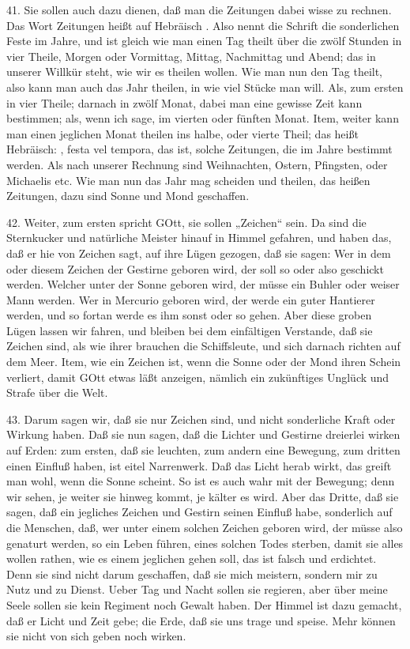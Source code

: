 41. Sie sollen auch dazu dienen, daß man die Zeitungen dabei wisse zu rechnen. Das Wort Zeitungen heißt auf Hebräisch . Also nennt die Schrift die sonderlichen Feste im Jahre, und ist gleich wie man einen Tag theilt über die zwölf Stunden in vier Theile, Morgen oder Vormittag, Mittag, Nachmittag und Abend; das in unserer Willkür steht, wie wir es theilen wollen. Wie man nun den Tag theilt, also kann man auch das Jahr theilen, in wie viel Stücke man will. Als, zum ersten in vier Theile; darnach in zwölf Monat, dabei man eine gewisse Zeit kann bestimmen; als, wenn ich sage, im vierten oder fünften Monat. Item, weiter kann man einen jeglichen Monat theilen ins halbe, oder vierte Theil; das heißt Hebräisch: , festa vel tempora, das ist, solche Zeitungen, die im Jahre bestimmt werden. Als nach unserer Rechnung sind Weihnachten, Ostern, Pfingsten, oder Michaelis etc. Wie man nun das Jahr mag scheiden und theilen, das heißen Zeitungen, dazu sind Sonne und Mond geschaffen.

42. Weiter, zum ersten spricht GOtt, sie sollen „Zeichen“ sein. Da sind die Sternkucker und natürliche Meister hinauf in Himmel gefahren, und haben das, daß er hie von Zeichen sagt, auf ihre Lügen gezogen, daß sie sagen: Wer in dem oder diesem Zeichen der Gestirne geboren wird, der soll so oder also geschickt werden. Welcher unter der Sonne geboren wird, der müsse ein Buhler oder weiser Mann werden. Wer in Mercurio geboren wird, der werde ein guter Hantierer werden, und so fortan werde es ihm sonst oder so gehen. Aber diese groben Lügen lassen wir fahren, und bleiben bei dem einfältigen Verstande, daß sie Zeichen sind, als wie ihrer brauchen die Schiffsleute, und sich darnach richten auf dem Meer. Item, wie ein Zeichen ist, wenn die Sonne oder der Mond ihren Schein verliert, damit GOtt etwas läßt anzeigen, nämlich ein zukünftiges Unglück und Strafe über die Welt.

43. Darum sagen wir, daß sie nur Zeichen sind, und nicht sonderliche Kraft oder Wirkung haben. Daß sie nun sagen, daß die Lichter und Gestirne dreierlei wirken auf Erden: zum ersten, daß sie leuchten, zum andern eine Bewegung, zum dritten einen Einfluß haben, ist eitel Narrenwerk. Daß das Licht herab wirkt, das greift man wohl, wenn die Sonne scheint. So ist es auch wahr mit der Bewegung; denn wir sehen, je weiter sie hinweg kommt, je kälter es wird. Aber das Dritte, daß sie sagen, daß ein jegliches Zeichen und Gestirn seinen Einfluß habe, sonderlich auf die Menschen, daß, wer unter einem
solchen Zeichen geboren wird, der müsse also genaturt werden, so ein Leben führen, eines solchen Todes sterben, damit sie alles wollen rathen, wie es einem jeglichen gehen soll, das ist falsch und erdichtet. Denn sie sind nicht darum geschaffen, daß sie mich meistern, sondern mir zu Nutz und zu Dienst. Ueber Tag und Nacht sollen sie regieren, aber über meine Seele sollen sie kein Regiment noch Gewalt haben. Der Himmel ist dazu gemacht, daß er Licht und Zeit gebe; die Erde, daß sie uns trage und speise. Mehr können sie nicht von sich geben noch wirken.

